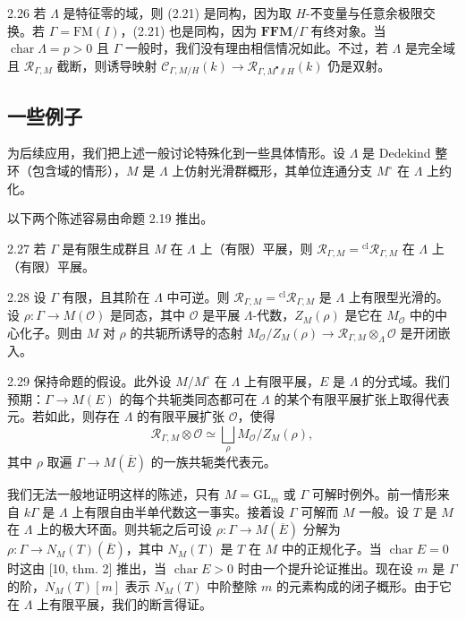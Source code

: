 \begin{rem}{2.26}
若 $\Lambda$ 是特征零的域，则 (2.21) 是同构，因为取 $H$-不变量与任意余极限交换。若 $\Gamma = \mathrm{FM}(I)$，(2.21) 也是同构，因为 $\mathbf{FFM}/\Gamma$ 有终对象。当 $\operatorname{char}\Lambda = p > 0$ 且 $\Gamma$ 一般时，我们没有理由相信情况如此。不过，若 $\Lambda$ 是完全域且 $\mathcal R_{\Gamma,M}$ 截断，则诱导映射 $\mathcal C_{\Gamma,M/H}(k) \to \mathcal R_{\Gamma,M^\bullet\sslash H}(k)$ 仍是双射。
\label{rem:zhu2-2-26}
\end{rem}

\subsection{一些例子}

为后续应用，我们把上述一般讨论特殊化到一些具体情形。设 $\Lambda$ 是 Dedekind 整环（包含域的情形），$M$ 是 $\Lambda$ 上仿射光滑群概形，其单位连通分支 $M^\circ$ 在 $\Lambda$ 上约化。

以下两个陈述容易由命题 2.19 推出。

\begin{prop}{2.27}
若 $\Gamma$ 是有限生成群且 $M$ 在 $\Lambda$ 上（有限）平展，则 $\mathcal R_{\Gamma,M} = {}^{\mathrm{cl}}\mathcal R_{\Gamma,M}$ 在 $\Lambda$ 上（有限）平展。
\label{prop:zhu2-2-27}
\end{prop}

\begin{prop}{2.28}
设 $\Gamma$ 有限，且其阶在 $\Lambda$ 中可逆。则 $\mathcal R_{\Gamma,M} = {}^{\mathrm{cl}}\mathcal R_{\Gamma,M}$ 是 $\Lambda$ 上有限型光滑的。设 $\rho\colon \Gamma \to M(\mathcal O)$ 是同态，其中 $\mathcal O$ 是平展 $\Lambda$-代数，$Z_M(\rho)$ 是它在 $M_{\mathcal O}$ 中的中心化子。则由 $M$ 对 $\rho$ 的共轭所诱导的态射 $M_{\mathcal O}/Z_M(\rho) \to \mathcal R_{\Gamma,M}\otimes_\Lambda \mathcal O$ 是开闭嵌入。
\label{prop:zhu2-2-28}
\end{prop}

\begin{rem}{2.29}
保持命题的假设。此外设 $M/M^\circ$ 在 $\Lambda$ 上有限平展，$E$ 是 $\Lambda$ 的分式域。我们预期：$\Gamma \to M(E)$ 的每个共轭类同态都可在 $\Lambda$ 的某个有限平展扩张上取得代表元。若如此，则存在 $\Lambda$ 的有限平展扩张 $\mathcal O$，使得
\[
\mathcal R_{\Gamma,M}\otimes \mathcal O \simeq \bigsqcup_\rho M_{\mathcal O}/Z_M(\rho),
\]
其中 $\rho$ 取遍 $\Gamma \to M(\overline E)$ 的一族共轭类代表元。
\label{rem:zhu2-2-29}
\end{rem}

我们无法一般地证明这样的陈述，只有 $M = \mathrm{GL}_m$ 或 $\Gamma$ 可解时例外。前一情形来自 $k\Gamma$ 是 $\Lambda$ 上有限自由半单代数这一事实。接着设 $\Gamma$ 可解而 $M$ 一般。设 $T$ 是 $M$ 在 $\Lambda$ 上的极大环面。则共轭之后可设 $\rho\colon \Gamma \to M(\overline E)$ 分解为 $\rho\colon \Gamma \to N_M(T)(\overline E)$，其中 $N_M(T)$ 是 $T$ 在 $M$ 中的正规化子。当 $\operatorname{char} E = 0$ 时这由 [10, thm. 2] 推出，当 $\operatorname{char} E > 0$ 时由一个提升论证推出。现在设 $m$ 是 $\Gamma$ 的阶，$N_M(T)[m]$ 表示 $N_M(T)$ 中阶整除 $m$ 的元素构成的闭子概形。由于它在 $\Lambda$ 上有限平展，我们的断言得证。

